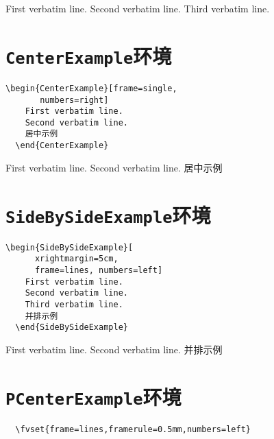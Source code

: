 \documentclass[twoside]{article}
\begin{document}
\begin{changebar}
\begin{Example}[frame=lines,framerule=1mm,numbers=left]
  First verbatim line.
  Second verbatim line.
  Third verbatim line.
\end{Example}

\newpage

\section{\texttt{CenterExample}环境}

\begin{Verbatim}[gobble=2]
  \begin{CenterExample}[frame=single,
       numbers=right]
    First verbatim line.
    Second verbatim line.
    居中示例
  \end{CenterExample}
\end{Verbatim}

\begin{CenterExample}[frame=single,numbers=right]
  First verbatim line.
  Second verbatim line.
  居中示例
\end{CenterExample}


\section{\texttt{SideBySideExample}环境}

\begin{Verbatim}[gobble=2]
  \begin{SideBySideExample}[
      xrightmargin=5cm,
      frame=lines, numbers=left]
    First verbatim line.
    Second verbatim line.
    Third verbatim line.
    并排示例
  \end{SideBySideExample}
\end{Verbatim}

\begin{SideBySideExample}[xrightmargin=5cm,frame=single,numbers=left]
  First verbatim line.
  Second verbatim line.
  并排示例
\end{SideBySideExample}



\iffalse



\section{\texttt{PCenterExample}环境}

\begin{Verbatim}
  \fvset{frame=lines,framerule=0.5mm,numbers=left}


\end{Verbatim}
\end{changebar}
\end{document}
